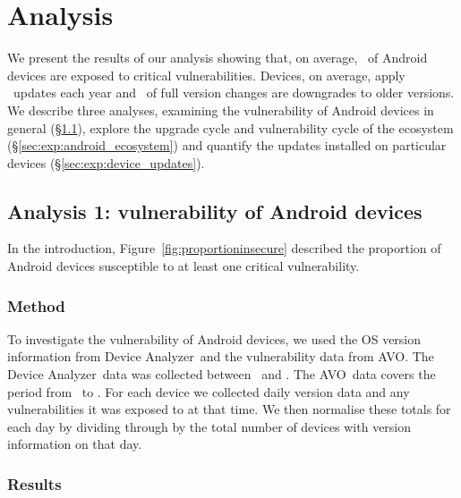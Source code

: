 \documentclass{llncs}
\newcommand{\da}{Device Analyzer}
\newcommand{\avo}{AVO}
\begin{document}
\section{Analysis}
\label{sec:results}
We present the results of our analysis showing that, on average, \daMeanInsecurityPerc\ of Android devices are exposed to critical vulnerabilities.
Devices, on average, apply \daUpdatesPerYear\ updates each year and \daPercUpdatesDowngrades\ of full version changes are downgrades to older versions.
We describe three analyses, examining the vulnerability of Android devices in general (\S\ref{sec:exp:versionsecurity}), explore the upgrade cycle and vulnerability cycle of the ecosystem (\S\ref{sec:exp:android_ecosystem}) and quantify the updates installed on particular devices (\S\ref{sec:exp:device_updates}).

\subsection{Analysis 1: vulnerability of Android devices}\label{sec:exp:versionsecurity}

In the introduction, Figure~\ref{fig:proportioninsecure} described the proportion of Android devices susceptible to at least one critical vulnerability.

\subsubsection{Method} 
To investigate the vulnerability of Android devices, we used the OS version information from \da\ and the vulnerability data from \avo.
The \da\ data was collected between \daStartDate\ and \daEndDate.
The \avo\ data covers the period from \avoFirstDataDate\ to \avoLastDataDate.
For each device we collected daily version data and any vulnerabilities it was exposed to at that time.
We then normalise these totals for each day by dividing through by the total number of devices with version information on that day.

\subsubsection{Results}
\end{document}
